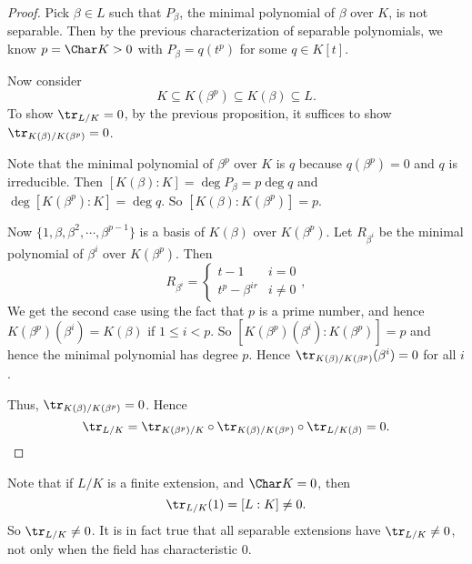 \documentclass[a4paper]{article}
\begin{document}
\begin{proof}
  Pick $\beta \in L$ such that $P_\beta$, the minimal polynomial of $\beta$ over $K$, is not separable. Then by the previous characterization of separable polynomials, we know $p = \Char K > 0$ with $P_\beta = q(t^p)$ for some $q \in K[t]$.

  Now consider
  \[
    K \subseteq K(\beta^p) \subseteq K(\beta) \subseteq L.
  \]
  To show $\tr_{L/K} = 0$, by the previous proposition, it suffices to show $\tr_{K(\beta)/K(\beta^p)} = 0$.

  Note that the minimal polynomial of $\beta^p$ over $K$ is $q$ because $q(\beta^p) = 0$ and $q$ is irreducible. Then $[K(\beta):K] = \deg P_\beta = p \deg q$ and $\deg[K(\beta^p):K] = \deg q$. So $[K(\beta):K(\beta^p)] = p$.

  Now $\{1, \beta, \beta^2, \cdots, \beta^{p - 1}\}$ is a basis of $K(\beta)$ over $K(\beta^p)$. Let $R_{\beta^i}$ be the minimal polynomial of $\beta^i$ over $K(\beta^p)$. Then
  \[
    R_{\beta^i} =
    \begin{cases}
      t - 1 & i = 0\\
      t^p - \beta^{ir} & i \not=0
    \end{cases},
  \]
  We get the second case using the fact that $p$ is a prime number, and hence $K(\beta^p)(\beta^i) = K(\beta)$ if $1 \leq i < p$. So $[K(\beta^p)(\beta^i):K(\beta^p)] = p$ and hence the minimal polynomial has degree $p$. Hence $\tr_{K(\beta)/K(\beta^p)} (\beta^i) = 0$ for all $i$.

  Thus, $\tr_{K(\beta)/K(\beta^p)} = 0$. Hence
  \[
    \tr_{L/K} = \tr_{K(\beta^p)/K} \circ \tr_{K(\beta)/K(\beta^p)} \circ \tr_{L/K(\beta)} = 0.
  \]
\end{proof}
Note that if $L/K$ is a finite extension, and $\Char K = 0$, then
\[
  \tr_{L/K}(1) = [L:K] \not= 0.
\]
So $\tr_{L/K} \not= 0$. It is in fact true that all separable extensions have $\tr_{L/K} \not= 0$, not only when the field has characteristic $0$.
\end{document}
